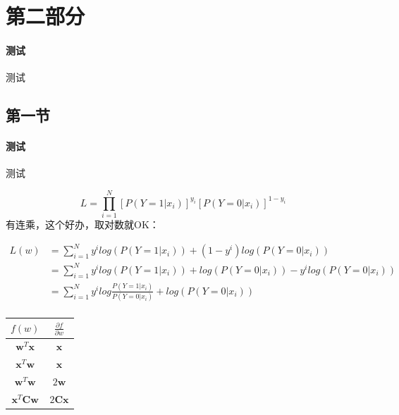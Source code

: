 \documentclass[a4paper, 11pt, hyperref, UTF8]{ctexart} %
\begin{document}

\section{第二部分}

\paragraph{测试}测试

\subsection{第一节}

\paragraph{测试}测试


$$ L=\prod_{i=1}^{N}{[P(Y=1|x_i)]^{y_i} [P(Y=0|x_i)]^{1-y_i}} $$
有连乘，这个好办，取对数就OK：

\begin{align*}
 L(w) &= \sum _{i=1} ^{N} {y^i log(P(Y=1|x_i)) + (1-y^i)log(P(Y=0|x_i))} \\
      &= \sum _{i=1} ^{N} {y^i log(P(Y=1|x_i)) + log(P(Y=0|x_i)) - y^ilog(P(Y=0|x_i))} \\
      &= \sum _{i=1} ^{N} {y^i log\frac{P(Y=1|x_i)} {P(Y=0|x_i)} + log(P(Y=0|x_i))} \\
\end{align*}


\begin{center}
\begin{tabular}{c|c}
\hline
$f(w)$                 & $\frac{\partial{f}}{\partial{w}}$   \\
\hline
$\bm{w}^T\bm{x}$       & $\bm{x}$                            \\
$\bm{x}^T\bm{w}$       & $\bm{x}$                            \\
$\bm{w}^T\bm{w}$       & $2\bm{w}$                           \\
$\bm{x}^T\bm{C}\bm{w}$ & $2\bm{Cx}$                          \\
\hline
\end{tabular}
\end{center}
\end{document}

